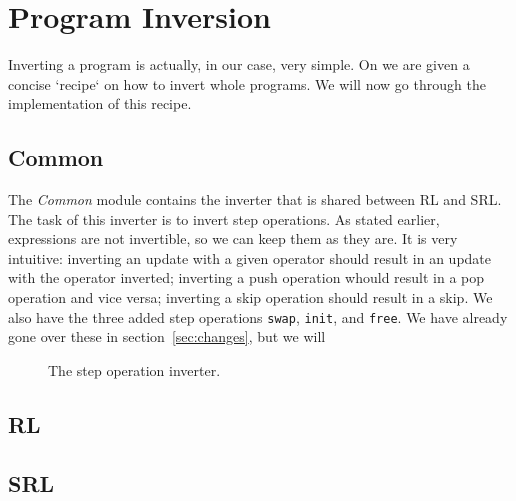 \section{Program Inversion}

Inverting a program is actually, in our case, very simple. On \cite[p.~104]{REV} we are given a concise `recipe` on how to invert whole programs. We will now go through the implementation of this recipe.

\subsection{Common}

The \textit{Common} module contains the inverter that is shared between RL and SRL. The task of this inverter is to invert step operations. As stated earlier, expressions are not invertible, so we can keep them as they are. It is very intuitive: inverting an update with a given operator should result in an update with the operator inverted; inverting a push operation whould result in a pop operation and vice versa; inverting a skip operation should result in a skip. We also have the three added step operations \texttt{swap}, \texttt{init}, and \texttt{free}. We have already gone over these in section~\ref{sec:changes}, but we will

\begin{figure}[H]
  
  \caption{The step operation inverter.}\label{fig:srlinterp}
\end{figure}

\subsection{RL}

\subsection{SRL}
